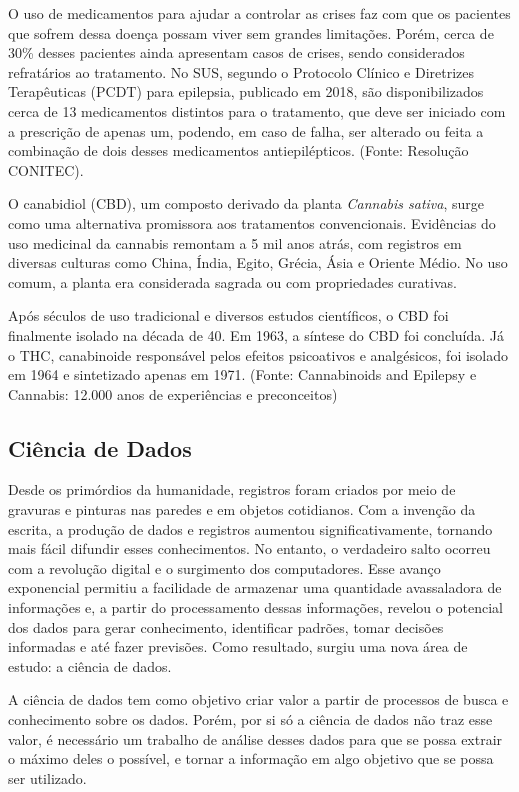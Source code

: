 \documentclass[article,a4paper,12pt,brazil,sumario=tradicional]{abntex2}
\begin{document}
O uso de medicamentos para ajudar a controlar as crises faz com que os pacientes que sofrem dessa doença possam viver sem grandes limitações. Porém, cerca de 30\% desses pacientes ainda apresentam casos de crises, sendo considerados refratários ao tratamento. No SUS, segundo o Protocolo Clínico e Diretrizes Terapêuticas (PCDT) para epilepsia, publicado em 2018, são disponibilizados cerca de 13 medicamentos distintos para o tratamento, que deve ser iniciado com a prescrição de apenas um, podendo, em caso de falha, ser alterado ou feita a combinação de dois desses medicamentos antiepilépticos. (Fonte: Resolução CONITEC).

O canabidiol (CBD), um composto derivado da planta \textit{Cannabis sativa}, surge como uma alternativa promissora aos tratamentos convencionais. Evidências do uso medicinal da cannabis remontam a 5 mil anos atrás, com registros em diversas culturas como China, Índia, Egito, Grécia, Ásia e Oriente Médio. No uso comum, a planta era considerada sagrada ou com propriedades curativas.

Após séculos de uso tradicional e diversos estudos científicos, o CBD foi finalmente isolado na década de 40. Em 1963, a síntese do CBD foi concluída. Já o THC, canabinoide responsável pelos efeitos psicoativos e analgésicos, foi isolado em 1964 e sintetizado apenas em 1971. (Fonte: Cannabinoids and Epilepsy e Cannabis: 12.000 anos de experiências e preconceitos)

\subsection{Ciência de Dados}

Desde os primórdios da humanidade, registros foram criados por meio de gravuras e pinturas nas paredes e em objetos cotidianos. Com a invenção da escrita, a produção de dados e registros aumentou significativamente, tornando mais fácil difundir esses conhecimentos. No entanto, o verdadeiro salto ocorreu com a revolução digital e o surgimento dos computadores. Esse avanço exponencial permitiu a facilidade de armazenar uma quantidade avassaladora de informações e, a partir do processamento dessas informações, revelou o potencial dos dados para gerar conhecimento, identificar padrões, tomar decisões informadas e até fazer previsões. Como resultado, surgiu uma nova área de estudo: a ciência de dados.

A ciência de dados tem como objetivo criar valor a partir de processos de busca e conhecimento sobre os dados. Porém, por si só a ciência de dados não traz esse valor, é necessário um trabalho de análise desses dados para que se possa extrair o máximo deles o possível, e tornar a informação em algo objetivo que se possa ser utilizado.
\end{document}
